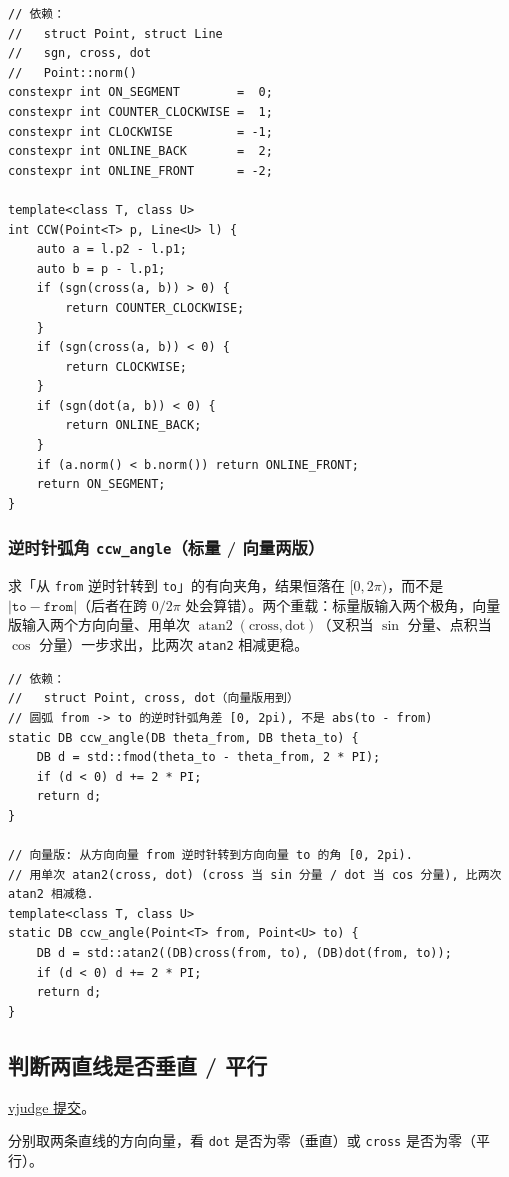 		\begin{verbatim}
// 依赖：
//   struct Point, struct Line
//   sgn, cross, dot
//   Point::norm()
constexpr int ON_SEGMENT        =  0;
constexpr int COUNTER_CLOCKWISE =  1;
constexpr int CLOCKWISE         = -1;
constexpr int ONLINE_BACK       =  2;
constexpr int ONLINE_FRONT      = -2;

template<class T, class U>
int CCW(Point<T> p, Line<U> l) {
	auto a = l.p2 - l.p1;
	auto b = p - l.p1;
	if (sgn(cross(a, b)) > 0) {
		return COUNTER_CLOCKWISE;
	}
	if (sgn(cross(a, b)) < 0) {
		return CLOCKWISE;
	}
	if (sgn(dot(a, b)) < 0) {
		return ONLINE_BACK;
	}
	if (a.norm() < b.norm()) return ONLINE_FRONT;
	return ON_SEGMENT;
}
		\end{verbatim}

		\subsubsection{逆时针弧角 \texttt{ccw\_angle}（标量 / 向量两版）}

		求「从 \texttt{from} 逆时针转到 \texttt{to}」的有向夹角，结果恒落在 $[0, 2\pi)$，而不是 $|\texttt{to} - \texttt{from}|$（后者在跨 $0/2\pi$ 处会算错）。两个重载：标量版输入两个极角，向量版输入两个方向向量、用单次 $\operatorname{atan2}(\mathrm{cross}, \mathrm{dot})$（叉积当 $\sin$ 分量、点积当 $\cos$ 分量）一步求出，比两次 \texttt{atan2} 相减更稳。

		\begin{verbatim}
// 依赖：
//   struct Point, cross, dot（向量版用到）
// 圆弧 from -> to 的逆时针弧角差 [0, 2pi), 不是 abs(to - from)
static DB ccw_angle(DB theta_from, DB theta_to) {
	DB d = std::fmod(theta_to - theta_from, 2 * PI);
	if (d < 0) d += 2 * PI;
	return d;
}

// 向量版: 从方向向量 from 逆时针转到方向向量 to 的角 [0, 2pi).
// 用单次 atan2(cross, dot) (cross 当 sin 分量 / dot 当 cos 分量), 比两次 atan2 相减稳.
template<class T, class U>
static DB ccw_angle(Point<T> from, Point<U> to) {
	DB d = std::atan2((DB)cross(from, to), (DB)dot(from, to));
	if (d < 0) d += 2 * PI;
	return d;
}
		\end{verbatim}

		\subsection{判断两直线是否垂直 / 平行}

		\href{https://vjudge.net/solution/64175524}{vjudge 提交}。

		分别取两条直线的方向向量，看 \texttt{dot} 是否为零（垂直）或 \texttt{cross} 是否为零（平行）。

